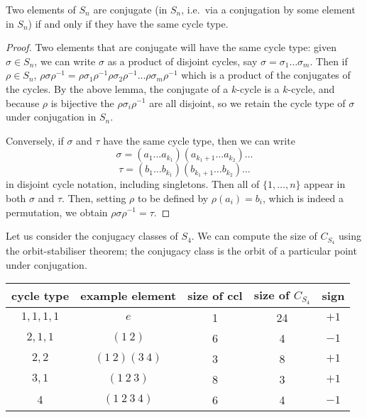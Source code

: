 \begin{proposition}
	Two elements of \(S_n\) are conjugate (in \(S_n\), i.e.\ via a conjugation by some element in \(S_n\)) if and only if they have the same cycle type.
\end{proposition}
\begin{proof}
	Two elements that are conjugate will have the same cycle type: given \(\sigma \in S_n\), we can write \(\sigma\) as a product of disjoint cycles, say \(\sigma = \sigma_1\dots\sigma_m\).
	Then if \(\rho \in S_n\), \(\rho \sigma \rho^{-1} = \rho \sigma_1 \rho^{-1} \rho \sigma_2 \rho^{-1} \dots \rho \sigma_m \rho^{-1}\) which is a product of the conjugates of the cycles.
	By the above lemma, the conjugate of a \(k\)-cycle is a \(k\)-cycle, and because \(\rho\) is bijective the \(\rho \sigma_i \rho^{-1}\) are all disjoint, so we retain the cycle type of \(\sigma\) under conjugation in \(S_n\).
	
	Conversely, if \(\sigma\) and \(\tau\) have the same cycle type, then we can write
	\[
		\sigma = (a_1\dots a_{k_1})(a_{k_1+1}\dots a_{k_2})\dots
	\]
	\[
		\tau = (b_1\dots b_{k_1})(b_{k_1+1}\dots b_{k_2})\dots
	\]
	in disjoint cycle notation, including singletons.
	Then all of \(\{ 1, \dots, n \}\) appear in both \(\sigma\) and \(\tau\).
	Then, setting \(\rho\) to be defined by \(\rho(a_i) = b_i\), which is indeed a permutation, we obtain \(\rho\sigma\rho^{-1}=\tau\).
\end{proof}
Let us consider the conjugacy classes of \(S_4\).
We can compute the size of \(C_{S_4}\) using the orbit-stabiliser theorem; the conjugacy class is the orbit of a particular point under conjugation.\medskip

\noindent\begin{tabular}{ccccc}
	cycle type  & example element  & size of ccl & size of \(C_{S_4}\) & sign   \\\midrule
	\(1,1,1,1\) & \(e\)            & 1           & 24                  & \(+1\) \\
	\(2,1,1\)   & \((1\ 2)\)       & 6           & 4                   & \(-1\) \\
	\(2,2\)     & \((1\ 2)(3\ 4)\) & 3           & 8                   & \(+1\) \\
	\(3,1\)     & \((1\ 2\ 3)\)    & 8           & 3                   & \(+1\) \\
	\(4\)       & \((1\ 2\ 3\ 4)\) & 6           & 4                   & \(-1\) \\
\end{tabular}

